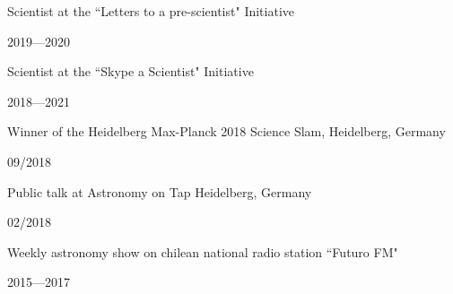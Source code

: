 \documentclass[12pt, a4paper]{article} %
\begin{document}
\vspace{0.2cm}

\begin{minipage}[t]{0.7\textwidth}
\begin{flushleft}%
  \setlength{\leftskip}{0.2cm}%
Scientist at the ``Letters to a pre-scientist" Initiative
\end{flushleft}
\end{minipage}
\begin{minipage}[t]{0.3\textwidth}
\hfill 2019---2020
\end{minipage}

\vspace{0.2cm}

\begin{minipage}[t]{0.7\textwidth}
\begin{flushleft}%
  \setlength{\leftskip}{0.2cm}%
Scientist at the ``Skype a Scientist" Initiative
\end{flushleft}
\end{minipage}
\begin{minipage}[t]{0.3\textwidth}
\hfill 2018---2021
\end{minipage}

\vspace{0.2cm}

\begin{minipage}[t]{0.7\textwidth}
\begin{flushleft}%
  \setlength{\leftskip}{0.2cm}%
Winner of the Heidelberg Max-Planck 2018 Science Slam, Heidelberg, Germany 
\end{flushleft}
\end{minipage}
\begin{minipage}[t]{0.3\textwidth}
\hfill 09/2018
\end{minipage}

\vspace{0.2cm}

\begin{minipage}[t]{0.7\textwidth}
\begin{flushleft}%
  \setlength{\leftskip}{0.2cm}%
Public talk at Astronomy on Tap Heidelberg, Germany 
\end{flushleft}
\end{minipage}
\begin{minipage}[t]{0.3\textwidth}
\hfill 02/2018
\end{minipage}

\vspace{0.2cm}

\begin{minipage}[t]{0.7\textwidth}
\begin{flushleft}%
  \setlength{\leftskip}{0.2cm}%
Weekly astronomy show on chilean national radio station ``Futuro FM"
\end{flushleft}
\end{minipage}
\begin{minipage}[t]{0.3\textwidth}
\hfill 2015---2017
\end{minipage}
\end{document}
